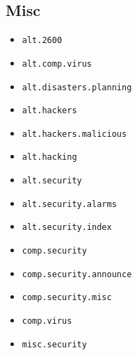 \subsection{Misc}
\begin{itemize}
\item {\tt alt.2600}
\item {\tt alt.comp.virus}
\item {\tt alt.disasters.planning}
\item {\tt alt.hackers}
\item {\tt alt.hackers.malicious}
\item {\tt alt.hacking}
\item {\tt alt.security}
\item {\tt alt.security.alarms}
\item {\tt alt.security.index}
\item {\tt comp.security}
\item {\tt comp.security.announce}
\item {\tt comp.security.misc}
\item {\tt comp.virus}
\item {\tt misc.security}
\end{itemize}
